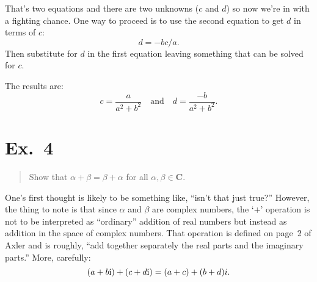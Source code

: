 \documentclass[10pt, a4paper, twocolumn]{article}
\newcommand{\set}[1]{\mathbold{#1}}
\newcommand{\ii}{\mathrm{i}}
\begin{document}
That’s two equations and there are two unknowns ($c$ and $d$) so now we’re in with a fighting chance. One way to proceed is to use the second equation to get $d$ in terms of $c$:
\begin{equation*}
  d = -bc / a.
\end{equation*}
Then substitute for $d$ in the first equation leaving something that can be solved for $c$.

The results are:
\begin{equation*}
  c = \frac{a}{a^2 + b^2}
  \quad\text{and}\quad 
    d = \frac{-b}{a^2 + b^2}.
\end{equation*}

\section*{Ex.~4}
\begin{quote}
Show that $\alpha + \beta = \beta + \alpha$ for all $\alpha, \beta \in \set{C}$.
\end{quote}
One's first thought is likely to be something like, ``isn't that just
true?'' However, the thing to note is that since $\alpha$ and $\beta$ are complex
numbers, the `$+$' operation is not to be interpreted as ``ordinary''
addition of real numbers but instead as addition in the space of complex
numbers. That operation is defined on page~2 of Axler and is roughly, ``add together separately the real parts and the imaginary parts.'' More, carefully:
\begin{equation*}
  (a + b\ii) + (c + d\ii) = (a+c) + (b+d)\\i.
\end{equation*}
\end{document}
